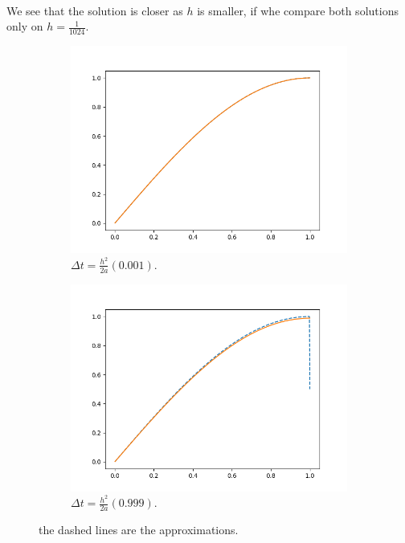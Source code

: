 \documentclass{article}
\begin{document}
\paragraph{}We see that the solution is closer as $h$ is smaller, if whe compare both solutions only on $h = \frac{1}{1024}$.
\begin{figure}[h!]
	\centering
	\begin{subfigure}[b]{0.4\linewidth}
		\includegraphics[width=\linewidth]{3.png}
		\caption{$\Delta t = \frac{h^2}{2a}(0.001)$.}
	\end{subfigure}
	\begin{subfigure}[b]{0.4\linewidth}
		\includegraphics[width=\linewidth]{4.png}
		\caption{$\Delta t = \frac{h^2}{2a} (0.999)$.}
	\end{subfigure}
	\caption{the dashed lines are the approximations.}
	\label{fig:cmp2}
\end{figure}
\end{document}
